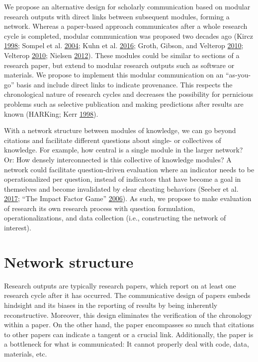 \documentclass[a5paper]{book}
\begin{document}
We propose an alternative design for scholarly communication based on
modular research outputs with direct links between subsequent modules,
forming a network. Whereas a paper-based approach communicates after a
whole research cycle is completed, modular communication was proposed
two decades ago (Kircz
\protect\hyperlink{ref-doi:10.1108ux2feum0000000007185}{1998}; Sompel et
al.
\protect\hyperlink{ref-doi:10.1045ux2fseptember2004-vandesompel}{2004};
Kuhn et al. \protect\hyperlink{ref-doi:10.7717ux2fpeerj-cs.78}{2016};
Groth, Gibson, and Velterop
\protect\hyperlink{ref-doi:10.3233ux2fisu-2010-0613}{2010}; Velterop
\protect\hyperlink{ref-doi:10.1163ux2f095796511X560006}{2010}; Nielsen
\protect\hyperlink{ref-isbn:9780691148908}{2012}). These modules could
be similar to sections of a research paper, but extend to modular
research outputs such as software or materials. We propose to implement
this modular communication on an \enquote{as-you-go} basis and include
direct links to indicate provenance. This respects the chronological
nature of research cycles and decreases the possibility for pernicious
problems such as selective publication and making predictions after
results are known (HARKing; Kerr
\protect\hyperlink{ref-doi:10.1207ux2fs15327957pspr0203_4}{1998}).

With a network structure between modules of knowledge, we can go beyond
citations and facilitate different questions about single- or
collectives of knowledge. For example, how central is a single module in
the larger network? Or: How densely interconnected is this collective of
knowledge modules? A network could facilitate question-driven evaluation
where an indicator needs to be operationalized per question, instead of
indicators that have become a goal in themselves and become invalidated
by clear cheating behaviors (Seeber et al.
\protect\hyperlink{ref-doi:10.1016ux2fj.respol.2017.12.004}{2017}; ``The
Impact Factor Game''
\protect\hyperlink{ref-doi:10.1371ux2fjournal.pmed.0030291}{2006}). As
such, we propose to make evaluation of research its own research process
with question formulation, operationalizations, and data collection
(i.e., constructing the network of interest).

\section{Network structure}\label{network-structure}

Research outputs are typically research papers, which report on at least
one research cycle after it has occurred. The communicative design of
papers embeds hindsight and its biases in the reporting of results by
being inherently reconstructive. Moreover, this design eliminates the
verification of the chronology within a paper. On the other hand, the
paper encompasses so much that citations to other papers can indicate a
tangent or a crucial link. Additionally, the paper is a bottleneck for
what is communicated: It cannot properly deal with code, data,
materials, etc.
\end{document}
